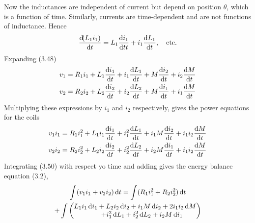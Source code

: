 \documentclass[a4paper,numbers=noenddot,12pt]{scrbook}
\begin{document}
Now the inductances are independent of current but depend on position $\theta$, which is a function of time. Similarly, currents are time-dependent and are not functions of inductance. Hence
\begin{equation*}
    \dfrac{\dif (L_1 i_1)}{\dif t} = L_1 \dfrac{\dif i_1}{\dif t t} + i_1 \dfrac{\dif L_1}{\dif t},\quad \text{etc.}
\end{equation*}
Expanding (3.48)
\begin{equation}
    \begin{aligned}
        v_1 & = R_1 i_1 + L_1 \dfrac{\dif i_1}{\dif t} + i_1 \dfrac{\dif L_1}{\dif t} + M \dfrac{\dif i_2}{\dif t} + i_2 \dfrac{\dif M}{\dif t} \\
        v_2 & = R_2 i_2 + L_2 \dfrac{\dif i_2}{\dif t} + i_2 \dfrac{\dif L_2}{\dif t} + M \dfrac{\dif i_1}{\dif t} + i_1 \dfrac{\dif M}{\dif t}
    \end{aligned}
    \label{eq:Eq3.49}
\end{equation}
Multiplying these expressions by $i_1$ and $i_2$ respectively, gives the power equations for the coils
\begin{equation}
    \begin{aligned}
        v_1 i_1 & = R_1 i_1^2 + L_1 i_1 \dfrac{\dif i_1}{\dif t} + i_1^2 \dfrac{\dif L_1}{\dif t} + i_1 M \dfrac{\dif i_2}{\dif t} + i_1 i_2 \dfrac{\dif M}{\dif t} \\
        v_2 i_2 & = R_2 i_2^2 + L_2 i_2 \dfrac{\dif i_2}{\dif t} + i_2^2 \dfrac{\dif L_2}{\dif t} + i_2 M \dfrac{\dif i_1}{\dif t} + i_1 i_2 \dfrac{\dif M}{\dif t}
    \end{aligned}
    \label{eq:Eq3.50}
\end{equation}
Integrating (3.50) with respect yo time and adding gives the energy balance equation (3.2),
\begin{multline}
    \int (v_1 i_1 + v_2 i_2) \dif t = \int (R_1 i_1^2 + R_2 i_2^2) \dif t \\
    + \int
    \begin{pmatrix}
        L_1 i_1 \dif i_1 + L_2 i_2 \dif i_2 + i_1 M \dif i_2 + 2 i_1 i_2 \dif M\\
        \qquad + i_1^2 \dif L_1 + i_2^2 \dif L_2 + i_2 M \dif i_1
    \end{pmatrix}
    \label{eq:Eq3.51}
\end{multline}
\end{document}
